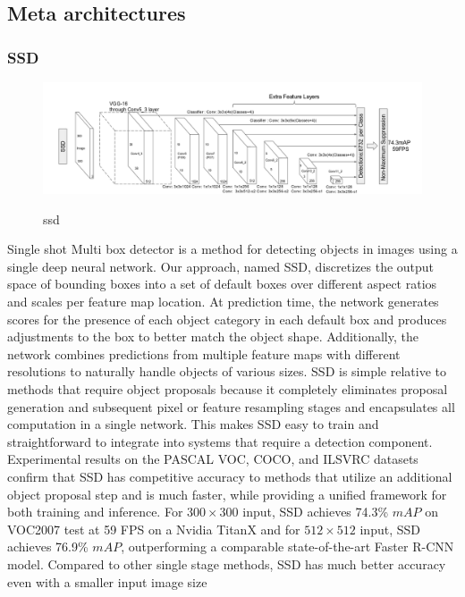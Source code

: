 \documentclass[12pt]{article}
\begin{document}
    \subsection{Meta architectures}
        \subsubsection{SSD}
        \begin{figure}[h]
    	\centering
    	\includegraphics[width=1\textwidth]{ssd.png}
       	\label{fig:mesh14}
	\caption{ssd}
	\end{figure} 
        Single shot Multi box detector is a method for detecting objects in images using a single deep neural network. Our approach, named SSD, discretizes the output space of bounding boxes into a set of default boxes over different aspect ratios and scales per feature map location. At prediction time, the network generates scores for the
presence of each object category in each default box and produces adjustments to
the box to better match the object shape. Additionally, the network combines predictions from multiple feature maps with different resolutions to naturally handle objects of various sizes. SSD is simple relative to methods that require object proposals because it completely eliminates proposal generation and subsequent pixel or feature resampling stages and encapsulates all computation in a single network. This makes SSD easy to train and straightforward to integrate into systems that require a detection component. Experimental results on the PASCAL VOC, COCO, and ILSVRC datasets confirm that SSD has competitive accuracy to methods that utilize an additional object proposal step and is much faster, while
providing a unified framework for both training and inference. For $300\times 300$ input, SSD achieves 74.3\% $mAP$
on VOC2007 test at 59 FPS on a Nvidia TitanX and for
$512\times 512$ input, SSD achieves 76.9\% $mAP$, outperforming a comparable state-of-the-art Faster R-CNN model. Compared to other single stage methods, SSD has much better accuracy even with a smaller input image size
        
\end{document}

